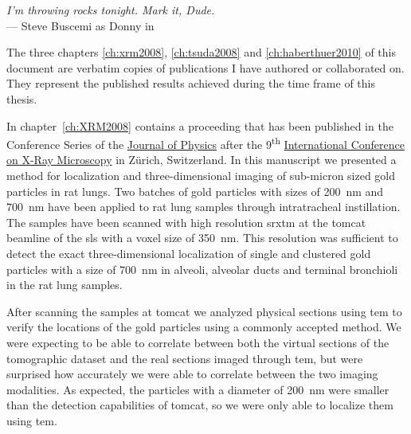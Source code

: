 \label{ch:publications}
\begin{flushright}{\slshape I'm throwing rocks tonight. Mark it, Dude.} \\ \medskip
    --- Steve Buscemi as Donny in \citep{TheBigLebowski}
\end{flushright}
\vspace{52mm}

The three chapters \ref{ch:xrm2008}, \ref{ch:tsuda2008} and \ref{ch:haberthuer2010} of this document are verbatim copies of publications I have authored or collaborated on. They represent the published results achieved during the time frame of this thesis.

In chapter~\ref{ch:XRM2008} contains a proceeding that has been published in the Conference Series of the \href{http://iopscience.iop.org/1742-6596/}{Journal of Physics} after the 9\textsuperscript{th} \href{http://xrm2008.web.psi.ch/}{International Conference on X-Ray Microscopy} in Zürich, Switzerland. In this manuscript we presented a method for localization and three-dimensional imaging of sub-micron sized gold particles in rat lungs. Two batches of gold particles with sizes of \SI{200}{\nano\meter} and \SI{700}{\nano\meter} have been applied to rat lung samples through intratracheal instillation. The samples have been scanned with high resolution \ac{srxtm} at the \ac{tomcat} beamline of the \ac{sls} with a voxel size of \SI{350}{\nano\meter}. This resolution was sufficient to detect the exact three-dimensional localization of single and clustered gold particles with a size of \SI{700}{\nano\meter} in alveoli, alveolar ducts and terminal bronchioli in the rat lung samples.

After scanning the samples at \ac{tomcat} we analyzed physical sections using \ac{tem} to verify the locations of the gold particles using a commonly accepted method. We were expecting to be able to correlate between both the virtual sections of the tomographic dataset and the real sections imaged through \ac{tem}, but were surprised how accurately we were able to correlate between the two imaging modalities. As expected, the particles with a diameter of \SI{200}{\nano\meter} were smaller than the detection capabilities of \ac{tomcat}, so we were only able to localize them using \ac{tem}.

